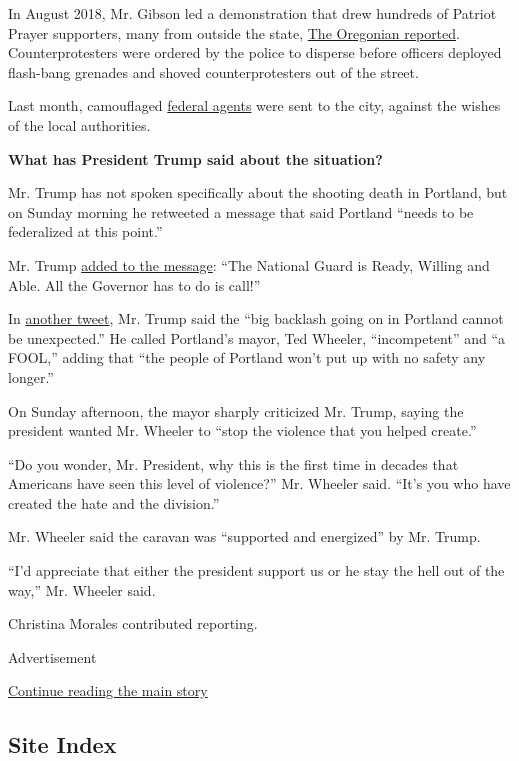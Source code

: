 In August 2018, Mr. Gibson led a demonstration that drew hundreds of
Patriot Prayer supporters, many from outside the state,
\href{https://www.oregonlive.com/portland/2018/08/protests_converge_in_portland.html}{The
Oregonian reported}. Counterprotesters were ordered by the police to
disperse before officers deployed flash-bang grenades and shoved
counterprotesters out of the street.

Last month, camouflaged
\href{https://www.nytimes3xbfgragh.onion/2020/07/25/us/portland-federal-legal-jurisdiction-courts.html}{federal
agents} were sent to the city, against the wishes of the local
authorities.

\textbf{What has President Trump said about the situation?}

Mr. Trump has not spoken specifically about the shooting death in
Portland, but on Sunday morning he retweeted a message that said
Portland ``needs to be federalized at this point.''

Mr. Trump
\href{https://twitter.com/realDonaldTrump/status/1300025245626228736?s=20}{added
to the message}: ``The National Guard is Ready, Willing and Able. All
the Governor has to do is call!''

In
\href{https://twitter.com/realDonaldTrump/status/1300010374855524352?s=20}{another
tweet}, Mr. Trump said the ``big backlash going on in Portland cannot be
unexpected.'' He called Portland's mayor, Ted Wheeler, ``incompetent''
and ``a FOOL,'' adding that ``the people of Portland won't put up with
no safety any longer.''

On Sunday afternoon, the mayor sharply criticized Mr. Trump, saying the
president wanted Mr. Wheeler to ``stop the violence that you helped
create.''

``Do you wonder, Mr. President, why this is the first time in decades
that Americans have seen this level of violence?'' Mr. Wheeler said.
``It's you who have created the hate and the division.''

Mr. Wheeler said the caravan was ``supported and energized'' by Mr.
Trump.

``I'd appreciate that either the president support us or he stay the
hell out of the way,'' Mr. Wheeler said.

Christina Morales contributed reporting.

Advertisement

\protect\hyperlink{after-bottom}{Continue reading the main story}

\hypertarget{site-index}{%
\subsection{Site Index}\label{site-index}}

